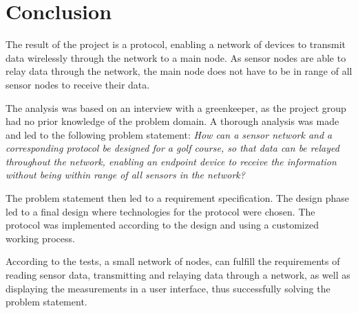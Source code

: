 \section{Conclusion}
The result of the project is a protocol, enabling a network of devices to transmit data wirelessly through the network to a main node. As sensor nodes are able to relay data through the network, the main node does not have to be in range of all sensor nodes to receive their data.

The analysis was based on an interview with a greenkeeper, as the project group had no prior knowledge of the problem domain. A thorough analysis was made and led to the following problem statement:
\textit{How can a sensor network and a corresponding protocol be designed for a golf course, so that data can be relayed throughout the network, enabling an endpoint device to receive the information without being within range of all sensors in the network?}
 
The problem statement then led to a requirement specification. The design phase led to a final design where technologies for the protocol were chosen. The protocol was implemented according to the design and using a customized working process.

According to the tests, a small network of nodes, can fulfill the requirements of reading sensor data, transmitting and relaying data through a network, as well as displaying the measurements in a user interface, thus successfully solving the problem statement.
